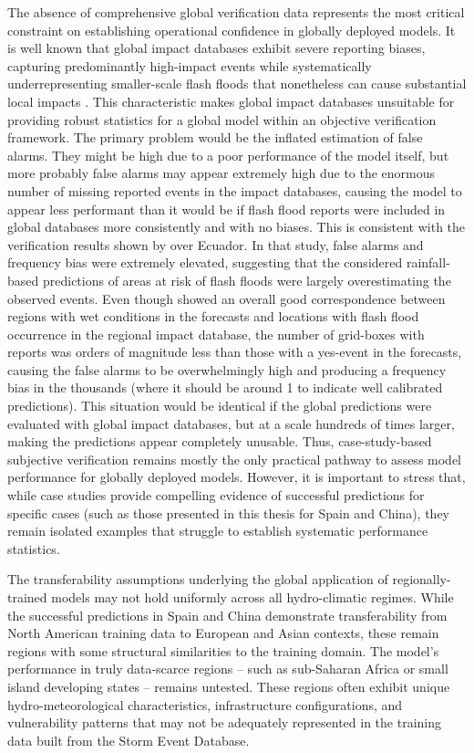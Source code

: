 The absence of comprehensive global verification data represents the most critical constraint on establishing operational confidence in globally deployed models. It is well known that global impact databases exhibit severe reporting biases, capturing predominantly high-impact events while systematically underrepresenting smaller-scale flash floods that nonetheless can cause substantial local impacts \citep{Panwar_2020}. This characteristic makes global impact databases unsuitable for providing robust statistics for a global model within an objective verification framework. The primary problem would be the inflated estimation of false alarms. They might be high due to a poor performance of the model itself, but more probably false alarms may appear extremely high due to the enormous number of missing reported events in the impact databases, causing the model to appear less performant than it would be if flash flood reports were included in global databases more consistently and with no biases. This is consistent with the verification results shown by \citet{Pillosu_2024} over Ecuador. In that study, false alarms and frequency bias were extremely elevated, suggesting that the considered rainfall-based predictions of areas at risk of flash floods were largely overestimating the observed events. Even though \citet{Pillosu_2024} showed an overall good correspondence between regions with wet conditions in the forecasts and locations with flash flood occurrence in the regional impact database, the number of grid-boxes with reports was orders of magnitude less than those with a yes-event in the forecasts, causing the false alarms to be overwhelmingly high and producing a frequency bias in the thousands (where it should be around 1 to indicate well calibrated predictions). This situation would be identical if the global predictions were evaluated with global impact databases, but at a scale hundreds of times larger, making the predictions appear completely unusable. Thus, case-study-based subjective verification remains mostly the only practical pathway to assess model performance for globally deployed models. However, it is important to stress that, while case studies provide compelling evidence of successful predictions for specific cases (such as those presented in this thesis for Spain and China), they remain isolated examples that struggle to establish systematic performance statistics.

The transferability assumptions underlying the global application of regionally-trained models may not hold uniformly across all hydro-climatic regimes. While the successful predictions in Spain and China demonstrate transferability from North American training data to European and Asian contexts, these remain regions with some structural similarities to the training domain. The model's performance in truly data-scarce regions – such as sub-Saharan Africa or small island developing states – remains untested. These regions often exhibit unique hydro-meteorological characteristics, infrastructure configurations, and vulnerability patterns that may not be adequately represented in the training data built from the Storm Event Database.


